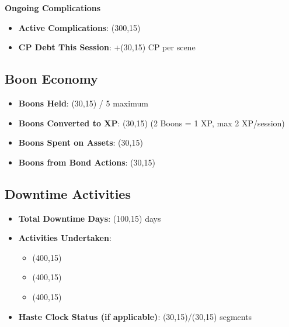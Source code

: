 \documentclass[11pt,letterpaper]{article}
\begin{document}
\vspace{0.3cm}

\noindent\textbf{Ongoing Complications}
\begin{itemize}[leftmargin=*]
    \item \textbf{Active Complications}: \framebox(300,15){}
    \item \textbf{CP Debt This Session}: +\framebox(30,15){} CP per scene
\end{itemize}

\subsection{Boon Economy}

\begin{itemize}[leftmargin=*]
    \item \textbf{Boons Held}: \framebox(30,15){} / 5 maximum
    \item \textbf{Boons Converted to XP}: \framebox(30,15){} (2 Boons = 1 XP, max 2 XP/session)
    \item \textbf{Boons Spent on Assets}: \framebox(30,15){}
    \item \textbf{Boons from Bond Actions}: \framebox(30,15){}
\end{itemize}

\subsection{Downtime Activities}

\begin{itemize}[leftmargin=*]
    \item \textbf{Total Downtime Days}: \framebox(100,15){} days
    \item \textbf{Activities Undertaken}: 
    \begin{itemize}
        \item \framebox(400,15){}
        \item \framebox(400,15){}
        \item \framebox(400,15){}
    \end{itemize}
    \item \textbf{Haste Clock Status (if applicable)}: \framebox(30,15){}/\framebox(30,15){} segments
\end{itemize}
\end{document}
